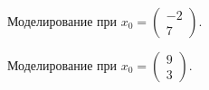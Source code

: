 \documentclass[a5paper, 10pt]{article}
\theoremstyle{definition}
\theoremstyle{plain}
\theoremstyle{remark}
\begin{document}
\begin{figure}[h!]
\caption{Моделирование при $x_0 = \begin{pmatrix} -2 \\ 7 \end{pmatrix}$.}
\end{figure}
\begin{figure}[h!]
\caption{Моделирование при $x_0 = \begin{pmatrix} 9 \\ 3 \end{pmatrix}$.}
\end{figure}
\end{document}

